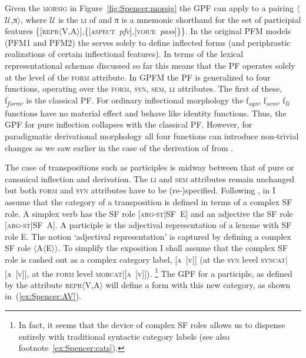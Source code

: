 \documentclass[output=paper]{langsci/langscibook}
\begin{document}
\begin{sloppypar}Given the \textsc{morsig} in Figure~\ref{fig:Spencer:morsig} the GPF can apply to a pairing $\langle$$\mathcal{U}$,π$\rangle$, where $\mathcal{U}$ is the \textsc{li} of  and π is a mnemonic shorthand for the set of participial features %
\{[\textsc{repr}$\langle$V,A$\rangle$],\{[\textsc{aspect}~\textit{pfv}],[\textsc{voice}~\textit{pass}]\}\}. %
In the original PFM models (PFM1 and PFM2) the  serves solely to define inflected forms (and periphrastic realizations of certain inflectional features). In terms of the lexical representational schemas discussed so far this means that the PF operates solely at the level of the \textsc{form} attribute. In GPFM the PF is generalized to four functions, operating over the \textsc{form}, \textsc{syn}, \textsc{sem}, \textsc{li} attributes. %
The first of these, f\textsubscript{\textit{form}}, is the classical PF. %
For ordinary inflectional morphology the f\textsubscript{\textit{syn}}, f\textsubscript{\textit{sem}}, f\textsubscript{\textit{li}} functions have no material effect and behave like identity functions. Thus, the GPF for pure inflection collapses with the classical PF. However, for paradigmatic derivational morphology all four functions can introduce non-trivial changes as we saw earlier in the case of the derivation of  from .\end{sloppypar}

The case of transpositions such as participles is midway between that of pure or canonical inflection and derivation. The \textsc{li} and \textsc{sem} attributes remain unchanged but both \textsc{form} and \textsc{syn} attributes have to be (re-)specified. %
Following %
\citet{Spencer99:transpositions,Spencer13}%
%
, in %
\citet{Spencer17:Russptcps} %
%
I assume that the category of a transposition is defined in terms of a complex SF role. A simplex verb has the SF role \mbox{[\textsc{arg-st}|SF E]} and an adjective the SF role \mbox{[\textsc{arg-st}|SF A].} A participle is the adjectival  representation of a lexeme with SF role E. The notion `adjectival representation' is captured by defining a complex SF role $\langle$A$\langle$E$\rangle\rangle$.     To simplify the exposition I shall assume that the complex SF role is cashed out as a complex category label,  \textsc{[a~[v]]} (at the \textsc{syn} level \textsc{syncat}|\textsc{[a~[v]]}, at the \textsc{form} level \textsc{morcat}|\textsc{[a~[v]]}).%
\footnote{In fact, it seems that the device of complex SF roles allows us to dispense entirely with traditional syntactic category labels (see also footnote~\ref{ex:Spencer:cats}).} %
The GPF for a participle, as defined by the attribute \textsc{repr}$\langle$V,A$\rangle$ will define a form with this new category, as shown in~(\ref{ex:Spencer:AV}).
\end{document}
